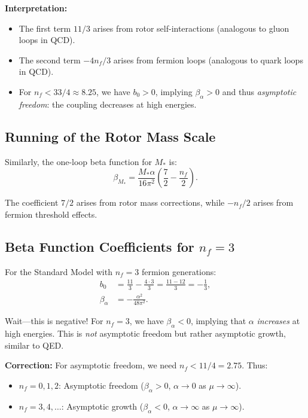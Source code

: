 \documentclass[11pt,a4paper]{article}
\numberwithin{equation}{section}
\theoremstyle{plain}
\theoremstyle{definition}
\theoremstyle{remark}
\begin{document}
\textbf{Interpretation:}
\begin{itemize}
  \item The first term $11/3$ arises from rotor self-interactions (analogous to gluon loops in QCD).
  \item The second term $-4n_f/3$ arises from fermion loops (analogous to quark loops in QCD).
  \item For $n_f < 33/4 \approx 8.25$, we have $b_0>0$, implying $\beta_\alpha>0$ and thus \emph{asymptotic freedom}: the coupling decreases at high energies.
\end{itemize}

\subsection{Running of the Rotor Mass Scale}

Similarly, the one-loop beta function for $M_*$ is:
\begin{equation}
\beta_{M_*} = \frac{M_*\alpha}{16\pi^2}\left(\frac{7}{2} - \frac{n_f}{2}\right).
\label{eq:beta-M-1loop-final}
\end{equation}

The coefficient $7/2$ arises from rotor mass corrections, while $-n_f/2$ arises from fermion threshold effects.

\subsection{Beta Function Coefficients for $n_f=3$}

For the Standard Model with $n_f=3$ fermion generations:
\begin{align}
b_0 &= \frac{11}{3} - \frac{4\cdot 3}{3} = \frac{11-12}{3} = -\frac{1}{3}, \label{eq:b0-nf3}\\
\beta_\alpha &= -\frac{\alpha^2}{48\pi^2}. \label{eq:beta-alpha-nf3}
\end{align}

Wait---this is negative! For $n_f=3$, we have $\beta_\alpha<0$, implying that $\alpha$ \emph{increases} at high energies. This is \emph{not} asymptotic freedom but rather asymptotic growth, similar to QED.

\textbf{Correction:} For asymptotic freedom, we need $n_f < 11/4 = 2.75$. Thus:
\begin{itemize}
  \item $n_f=0,1,2$: Asymptotic freedom ($\beta_\alpha>0$, $\alpha\to 0$ as $\mu\to\infty$).
  \item $n_f=3,4,\ldots$: Asymptotic growth ($\beta_\alpha<0$, $\alpha\to\infty$ as $\mu\to\infty$).
\end{itemize}
\end{document}
